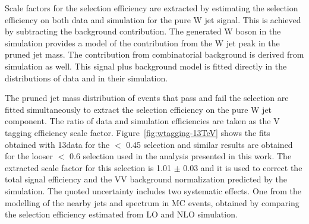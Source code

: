 Scale factors for the \nsubj selection efficiency are extracted by estimating the selection efficiency on both data and simulation for the pure W jet signal. This is achieved by subtracting the background contribution.
The generated W boson in the \ttbar simulation provides a model of the contribution from the W jet peak in the pruned jet mass. The contribution from combinatorial background is derived from \ttbar simulation as well. This signal plus background model is fitted directly in the distributions of data and in their simulation.

The pruned jet mass distribution of events that pass and fail the \nsubj selection are fitted simultaneously to extract the selection efficiency on the pure W jet component. The ratio of data and simulation efficiencies are taken as the V tagging efficiency scale factor. Figure~\ref{fig:wtagging-13TeV} shows the fits obtained with 13\TeV data for the \nsubj $<$ 0.45 selection and similar results are obtained for the looser \nsubj $<$ 0.6 selection used in the \lnujet analysis presented in this work. 
The extracted scale factor for this selection is 1.01 $\pm$ 0.03 and it is used to correct the total signal efficiency and the VV background normalization predicted by the simulation.
The quoted uncertainty includes two systematic effects. One from the modelling of the nearby jets and \pt spectrum in \ttbar MC events, obtained by comparing the selection efficiency estimated from LO and NLO \ttbar simulation. %
